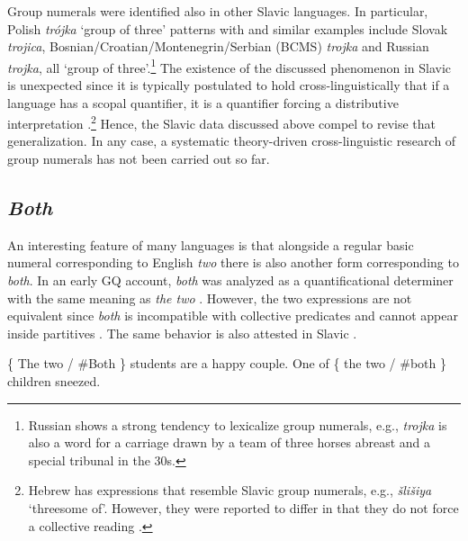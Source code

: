 \documentclass[output=paper]{langscibook}
\begin{document}
	\noindent Group numerals were identified also in other Slavic languages. In particular, Polish \textit{trójka} `group of three' patterns with  \citep{wagiel2015sums} and similar examples include Slovak \textit{trojica}, Bosnian/Croatian/Montenegrin/Serbian (BCMS) \textit{trojka} and Russian \textit{trojka}, all `group of three'.\footnote{Russian shows a strong tendency to lexicalize group numerals, e.g., \textit{trojka} is also a word for a carriage drawn by a team of three horses abreast and a special tribunal in the 30s.} The existence of the discussed phenomenon in Slavic is unexpected since it is typically postulated to hold cross-linguistically that if a language has a scopal quantifier, it is a quantifier forcing a distributive interpretation \citep{gil1992scopal}.\footnote{Hebrew has expressions that resemble Slavic group numerals, e.g., \textit{šlišiya} `threesome of'. However, they were reported to differ in that they do not force a collective reading \citep{gil1992scopal}.} Hence, the Slavic data discussed above compel to revise that generalization. In any case, a systematic theory-driven cross-linguistic research of group numerals has not been carried out so far. 
 
		\subsection{\textit{Both}}\label{sec:both} 
	
	An interesting feature of many languages is that alongside a regular basic numeral corresponding to English \textit{two} there is also another form corresponding to \textit{both}. In an early GQ account, \textit{both} was analyzed as a quantificational determiner with the same meaning as \textit{the two} \citep{barwise_cooper1981generalized}. However, the two expressions are not equivalent since \textit{both} is incompatible with collective predicates  and cannot appear inside partitives  \citep{ladusaw1982semantic}. The same behavior is also attested in Slavic  \citep{lazorczyk-pancheva2009from}.

	\ea\label{ex:both} \ea \{ The two / \#Both \} students are a happy couple.\label{ex:both-collective}
	\ex One of \{ the two / \#both \} children sneezed.\label{ex:both-partitive}
	\z
	\z

		\ea\label{ex:both-russian} \label{ex:both-collective-russian}
	    \label{ex:both-partitive-russian}
	\z
	\z
\end{document}
